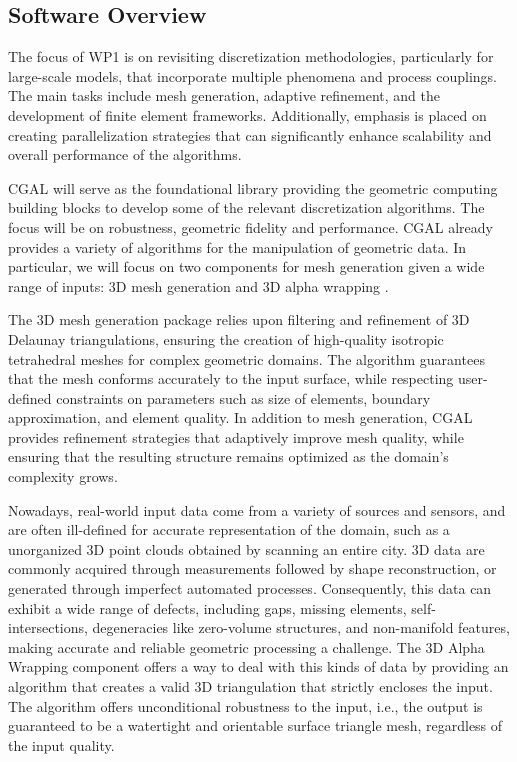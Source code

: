 \subsection{Software Overview}
\label{sec:WP1:CGAL:summary}


The focus of WP1 is on revisiting discretization methodologies, particularly for large-scale models,
that incorporate multiple phenomena and process couplings. The main tasks include mesh generation, adaptive refinement, 
and the development of finite element frameworks. Additionally, emphasis is placed on creating parallelization 
strategies that can significantly enhance scalability and overall performance of the algorithms. 

CGAL will serve as the foundational library providing the geometric computing building blocks to develop some of the 
relevant discretization algorithms. The focus will be on robustness, geometric fidelity and performance. 
CGAL already provides a variety of algorithms for the manipulation of geometric data.
In particular, we will focus on two components for mesh generation given a wide range of inputs: 3D mesh generation \cite{jamin_cgalmesh_2015,alliez_3d_2024} and 3D alpha wrapping \cite{portaneri_alpha_2022,alliez_3d_2024-1}.

The 3D mesh generation package relies upon filtering and refinement of 3D Delaunay triangulations, ensuring the creation of high-quality isotropic tetrahedral meshes for complex geometric domains. 
The algorithm guarantees that the mesh conforms accurately to the input surface, while respecting user-defined constraints on parameters such as size of elements, boundary approximation, and element quality. In addition to mesh generation, CGAL provides refinement strategies that adaptively improve mesh quality, while ensuring that the resulting structure remains optimized as the domain's complexity grows.



Nowadays, real-world input data come from a variety of sources and sensors, and are often ill-defined for accurate representation of the domain, 
such as a unorganized 3D point clouds obtained by scanning an entire city. 3D data are commonly acquired through measurements followed by shape reconstruction, 
or generated through imperfect automated processes. Consequently, this data can exhibit a wide range of defects, including gaps, 
missing elements, self-intersections, degeneracies like zero-volume structures, and non-manifold features, making accurate 
and reliable geometric processing a challenge. The 3D Alpha Wrapping component offers a way to deal with this kinds of data by providing an algorithm that creates a valid 3D triangulation that strictly encloses the input. The algorithm offers unconditional robustness to the input, i.e., the output is guaranteed to be a watertight and orientable surface triangle mesh, regardless of the input quality.

